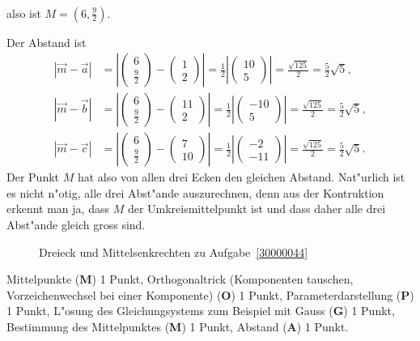 \begin{loesung}
\begin{teilaufgaben}
\begin{align*}
\end{align*}
also ist $M=(6,\frac92)$.
\item
Der Abstand ist
\begin{align*}
|\vec{m}-\vec{a}|
&=
\left|\begin{pmatrix}6\\\frac92\end{pmatrix}-\begin{pmatrix}1\\2\end{pmatrix}\right|
=
\frac12\left|\begin{pmatrix}10\\5\end{pmatrix}\right|
=
\frac{\sqrt{125}}2=\frac52\sqrt{5},
\\
|\vec{m}-\vec{b}|
&=
\left|\begin{pmatrix}6\\\frac92\end{pmatrix}-\begin{pmatrix}11\\2\end{pmatrix}\right|
=
\frac12\left|\begin{pmatrix}-10\\5\end{pmatrix}\right|
=
\frac{\sqrt{125}}2=\frac52\sqrt{5},
\\
|\vec{m}-\vec{c}|
&=
\left|\begin{pmatrix}6\\\frac92\end{pmatrix}-\begin{pmatrix}7\\10\end{pmatrix}\right|
=
\frac12\left|\begin{pmatrix}-2\\-11\end{pmatrix}\right|
=
\frac{\sqrt{125}}2=\frac52\sqrt{5}.
\end{align*}
Der Punkt $M$ hat also von allen drei Ecken den gleichen Abstand.
Nat"urlich ist es nicht n"otig, alle drei Abst"ande auszurechnen, denn
aus der Kontruktion erkennt man ja, dass $M$ der Umkreismittelpunkt ist
und dass daher alle drei Abst"ande gleich gross sind.
\end{teilaufgaben}
\begin{figure}
\centering
{}
\caption{Dreieck und Mittelsenkrechten zu Aufgabe~\ref{30000044}
\label{30000044:dreieck}}
\end{figure}
\end{loesung}

\begin{bewertung}
Mittelpunkte ({\bf M}) 1 Punkt, Orthogonaltrick (Komponenten tauschen, 
Vorzeichenwechsel bei einer Komponente) ({\bf O}) 1 Punkt,
Parameterdarstellung ({\bf P}) 1 Punkt, L"osung des Gleichungsystems
zum Beispiel mit Gauss ({\bf G}) 1 Punkt, Bestimmung des Mittelpunktes
({\bf M}) 1 Punkt, Abstand ({\bf A}) 1 Punkt.
\end{bewertung}

